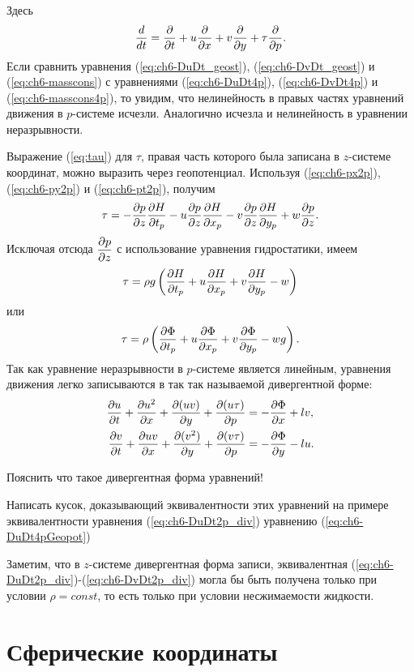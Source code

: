    Здесь 
   \begin{equation*}
       \displaystyle\frac{d }{d t}=\displaystyle\frac{\partial }{\partial t}+u\displaystyle\frac{\partial }{\partial x}+v\displaystyle\frac{\partial }{\partial y}+\tau\displaystyle\frac{\partial }{\partial p}.
   \end{equation*}
   Если сравнить уравнения (\ref{eq:ch6-DuDt_geost}), (\ref{eq:ch6-DvDt_geost}) и (\ref{eq:ch6-masscons}) с уравнениями (\ref{eq:ch6-DuDt4p}), (\ref{eq:ch6-DvDt4p}) и (\ref{eq:ch6-masscons4p}), то увидим, что нелинейность в правых частях уравнений движения в $p$-системе исчезли. Аналогично исчезла и нелинейность в уравнении неразрывности.

   Выражение (\ref{eq:tau}) для $\tau$, правая часть которого была записана в $z$-системе координат, можно выразить через геопотенциал. Используя (\ref{eq:ch6-px2p}), (\ref{eq:ch6-py2p}) и (\ref{eq:ch6-pt2p}), получим
   \[
    \tau=-\displaystyle\frac{\partial p}{\partial z}\displaystyle\frac{\partial H}{\partial t_p}-u\displaystyle\frac{\partial p}{\partial z}\displaystyle\frac{\partial H}{\partial x_p}-v\displaystyle\frac{\partial p}{\partial z}\displaystyle\frac{\partial H}{\partial y_p}+w\displaystyle\frac{\partial p}{\partial z}.
   \]
   Исключая отсюда $\displaystyle\frac{\partial p}{\partial z}$ с использование уравнения гидростатики, имеем
   \begin{equation}
       \tau=\rho g \left( \displaystyle\frac{\partial H}{\partial t_p} + u\displaystyle\frac{\partial H}{\partial x_p} + v\displaystyle\frac{\partial H}{\partial y_p} - w \right)
   \end{equation}
   или
   \begin{equation}
       \tau=\rho \left( \displaystyle\frac{\partial \Phi}{\partial t_p} + u\displaystyle\frac{\partial \Phi}{\partial x_p} + v\displaystyle\frac{\partial \Phi}{\partial y_p} - wg \right).
   \end{equation}
   Так как уравнение неразрывности в $p$-системе является линейным, уравнения движения легко записываются в так так называемой дивергентной форме:
   \begin{align}
       \displaystyle\frac{\partial u}{\partial t} + \displaystyle\frac{\partial u^2}{\partial x} + \displaystyle\frac{\partial (uv)}{\partial y}  + \displaystyle\frac{\partial (u \tau)}{\partial p} &= -\displaystyle\frac{\partial \Phi}{\partial x}+lv, \label{eq:ch6-DuDt2p_div} \\
       \displaystyle\frac{\partial v}{\partial t} + \displaystyle\frac{\partial uv}{\partial x}  + \displaystyle\frac{\partial (v^2)}{\partial y} + \displaystyle\frac{\partial (v \tau)}{\partial p} &= -\displaystyle\frac{\partial \Phi}{\partial y}-lu. \label{eq:ch6-DvDt2p_div}
   \end{align}
   \begin{warn}
        Пояснить что такое дивергентная форма уравнений!
   \end{warn}
   \begin{warn}
        Написать кусок, доказывающий эквивалентности этих уравнений на примере эквивалентности уравнения (\ref{eq:ch6-DuDt2p_div}) уравнению (\ref{eq:ch6-DuDt4pGeopot})
   \end{warn}
   Заметим, что в $z$-системе дивергентная форма записи, эквивалентная (\ref{eq:ch6-DuDt2p_div})-(\ref{eq:ch6-DvDt2p_div}) могла бы быть получена только при условии $\rho=const$, то есть только при условии несжимаемости жидкости.
   
   

    
    

\section{Сферические координаты}





